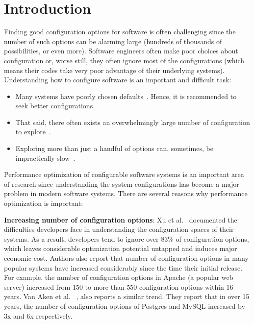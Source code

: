 \documentclass[sigconf]{acmart}
\newcommand{\bi}{\begin{itemize}}%
\newcommand{\ei}{\end{itemize}}
\begin{document}
\maketitle


\section{Introduction}
Finding good configuration options for software is often challenging since the number of such options can be alarming large (hundreds of thousands of possibilities, or even more).
Software engineers often make poor choices
about configuration or,  worse still, they often ignore most of the configurations 
(which means their codes take very poor advantage of their underlying systems). 
Understanding how to configure software   is an important and difficult task:
\bi
\item Many systems have poorly  chosen defaults~\cite{van2017automatic,herodotou2011starfish}. Hence, it is recommended to seek better configurations.
\item That said, there often exists an overwhelmingly large number of configuration to explore~\cite{xu2015hey}.
\item Exploring more than just a handful of options can, sometimes, be impractically slow~\cite{zhu2017optimized}.
\ei


Performance optimization of configurable software systems
is an important area of research since understanding
the system configurations has become a major problem in
modern software systems. There are several reasons why
performance optimization is important:

\textbf{Increasing number of configuration options}: Xu et al.~\cite{xu2015hey} documented
the difficulties developers face in understanding the configuration spaces of their systems. As a result,
developers tend to ignore over 83\% of configuration options,
which leaves considerable optimization potential untapped
and induces major economic cost. Authors also report
that number of configuration options in many popular systems
have increased considerably since the time their initial
release. For example, the number of configuration options in
Apache (a popular web server) increased from 150 to more
than 550 configuration options within 16 years. Van Aken et
al. ~\cite{van2017automatic}, also reports a similar trend. They report that in over
15 years, the number of configuration options of Postgres
and MySQL increased by 3x and 6x respectively.
\end{document}
